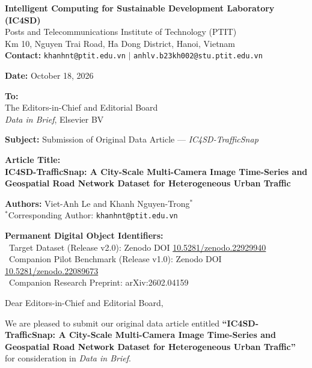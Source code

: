 \documentclass[10.5pt,a4paper]{article}
\begin{document}
\noindent
\textbf{Intelligent Computing for Sustainable Development Laboratory (IC4SD)} \\
Posts and Telecommunications Institute of Technology (PTIT) \\
Km 10, Nguyen Trai Road, Ha Dong District, Hanoi, Vietnam \\
\textbf{Contact:} \texttt{khanhnt@ptit.edu.vn} $\vert$ \texttt{anhlv.b23kh002@stu.ptit.edu.vn}

\vspace{5mm}
\noindent
\textbf{Date:} October 18, 2026

\vspace{3mm}
\noindent
\textbf{To:} \\
The Editors-in-Chief and Editorial Board \\
\textit{Data in Brief}, Elsevier BV

\vspace{4mm}
\noindent
\textbf{Subject:} Submission of Original Data Article --- \textit{IC4SD-TrafficSnap}

\vspace{2mm}
\noindent
\textbf{Article Title:} \\
\textbf{IC4SD-TrafficSnap: A City-Scale Multi-Camera Image Time-Series and Geospatial Road Network Dataset for Heterogeneous Urban Traffic}

\vspace{2mm}
\noindent
\textbf{Authors:} Viet-Anh Le and Khanh Nguyen-Trong$^*$ \\
$^*$Corresponding Author: \texttt{khanhnt@ptit.edu.vn}

\vspace{2mm}
\noindent
\textbf{Permanent Digital Object Identifiers:} \\
\textbullet~Target Dataset (Release v2.0): Zenodo DOI \href{https://doi.org/10.5281/zenodo.22929940}{10.5281/zenodo.22929940} \\
\textbullet~Companion Pilot Benchmark (Release v1.0): Zenodo DOI \href{https://doi.org/10.5281/zenodo.22089673}{10.5281/zenodo.22089673} \\
\textbullet~Companion Research Preprint: arXiv:2602.04159

\vspace{4mm}
\noindent
Dear Editors-in-Chief and Editorial Board,

\vspace{2mm}
We are pleased to submit our original data article entitled \textbf{``IC4SD-TrafficSnap: A City-Scale Multi-Camera Image Time-Series and Geospatial Road Network Dataset for Heterogeneous Urban Traffic''} for consideration in \textit{Data in Brief}. 
\end{document}

